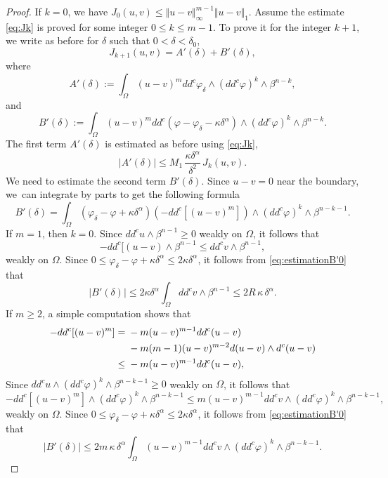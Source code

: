 \begin{proof}
If $k = 0$, we have $J_0 (u,v) \leq \Vert u - v\Vert_{\infty}^{m - 1} \Vert u - v\Vert_1$. Assume the estimate \eqref{eq:Jk} is proved for some integer $0 \leq k \leq m-1$. To prove it for the integer $k + 1$, we write as before for $\delta$ such that $0 < \delta < \delta_0$,
\[
J_{k+1} (u,v) = A' (\delta) + B' (\delta),
\]
where
\[
A' (\delta):=\int_{\Omega}(u-v)^m dd^c \varphi_{\delta}\wedge(dd^c\varphi)^{k} \wedge\beta^{n-k},
\]
and
\[
B' (\delta):= \int_{\Omega}(u-v)^m dd^c(\varphi - \varphi_{\delta} - \kappa \delta^\alpha)\wedge(dd^c\varphi)^{k} \wedge\beta^{n-k}.
\]
The first term $A' (\delta)$ is estimated as before using \eqref{eq:Jk}, \ie
\begin{equation} \label{eq:estimationA'}
|A' (\delta)|\leq M_1 \,\frac{\kappa \delta^{\alpha}}{\delta^2}\, J_k (u,v).
\end{equation}
We need to estimate the second term $B' (\delta)$. Since $ u - v = 0$ near the boundary, we~can integrate by parts to get the following formula
\begin{equation} \label{eq:estimationB'0}
B' (\delta) = \int_{\Omega} (\varphi_{\delta} - \varphi + \kappa \delta^\alpha) \left(- dd^c[ (u-v)^m]\right) \wedge (dd^c\varphi)^k\wedge\beta^{n-k-1}.
\end{equation}
If $m = 1$, then $k = 0$. Since $dd^c u \wedge \beta^{n-1} \geq 0$ weakly on $\Omega$, it follows that
\[
- dd^c [(u-v) \wedge \beta^{n-1} \leq dd^c v \wedge \beta^{n-1},
\]
weakly on $\Omega$.
Since $0 \leq \varphi_{\delta} - \varphi + \kappa \delta^\alpha \leq 2 \kappa \delta^\alpha$, it follows from \eqref{eq:estimationB'0} that
\begin{equation*} \label{eq:estimateB'1}
\vert B' (\delta) \vert \leq 2 \kappa \delta^\alpha \int_\Omega dd^c v \wedge\beta^{n-1} \leq 2 R \, \kappa \, \delta^\alpha.
\end{equation*}
If $ m \geq 2$, a simple computation shows that
\begin{align*}
- dd^c [(u-v)^m] & ={} - m (u-v)^{m -1} dd^c (u - v) \\
&\hphantom{{}={}}- m (m-1) (u-v)^{m - 2} d(u-v) \wedge d^c(u-v) \\
&\leq{}  - m (u-v)^{m -1} dd^c (u- v),
\end{align*}
Since $ dd^c u \wedge (dd^c\varphi)^k\wedge\beta^{n-k-1} \geq 0$ weakly on $\Omega$, it follows that
\[
- dd^c [(u-v)^m] \wedge (dd^c\varphi)^k\wedge\beta^{n-k-1} \leq m (u-v)^{m -1} dd^c v\wedge (dd^c\varphi)^k\wedge\beta^{n-k-1},
\]
weakly on $\Omega$.
Since $0 \leq \varphi_{\delta} - \varphi + \kappa \delta^\alpha \leq 2 \kappa \delta^\alpha$, it follows from \eqref{eq:estimationB'0} that
\begin{equation} \label{eq:estimation2}
|B' (\delta)| \leq 2 m \, \kappa \, \delta^{\alpha} \int_\Omega (u-v)^{m -1} dd^c v \wedge (dd^c\varphi)^k\wedge\beta^{n-k-1}.
\end{equation}


\end{proof}
